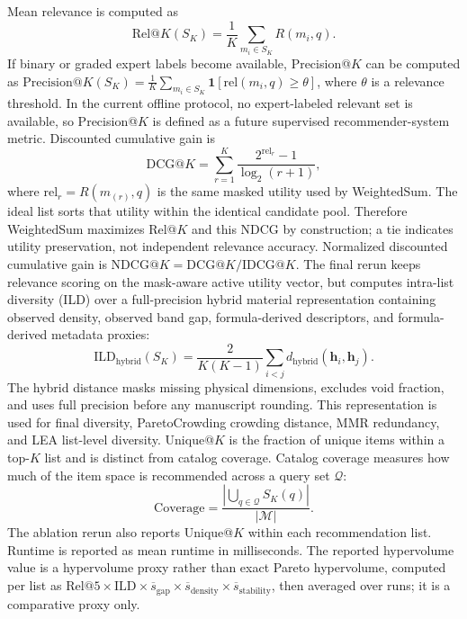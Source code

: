 \documentclass[12pt,a4paper]{article}
\begin{document}
Mean relevance is computed as
\begin{equation}
  \mathrm{Rel}@K(S_K) = \frac{1}{K}\sum_{m_i \in S_K} R(m_i, q).
\end{equation}
If binary or graded expert labels become available, Precision@$K$ can be computed as $\mathrm{Precision}@K(S_K) = \frac{1}{K}\sum_{m_i\in S_K}\mathbf{1}[\mathrm{rel}(m_i,q)\geq\theta]$, where $\theta$ is a relevance threshold. In the current offline protocol, no expert-labeled relevant set is available, so Precision@$K$ is defined as a future supervised recommender-system metric. Discounted cumulative gain is
\begin{equation}
  \mathrm{DCG}@K = \sum_{r=1}^{K}\frac{2^{\mathrm{rel}_r}-1}{\log_2(r+1)},
\end{equation}
where $\mathrm{rel}_r=R(m_{(r)},q)$ is the same masked utility used by WeightedSum. The ideal list sorts that utility within the identical candidate pool. Therefore WeightedSum maximizes Rel@$K$ and this NDCG by construction; a tie indicates utility preservation, not independent relevance accuracy. Normalized discounted cumulative gain is $\mathrm{NDCG}@K = \mathrm{DCG}@K / \mathrm{IDCG}@K$. The final rerun keeps relevance scoring on the mask-aware active utility vector, but computes intra-list diversity (ILD) over a full-precision hybrid material representation containing observed density, observed band gap, formula-derived descriptors, and formula-derived metadata proxies:
\begin{equation}
  \mathrm{ILD}_{\mathrm{hybrid}}(S_K) = \frac{2}{K(K-1)}\sum_{i<j}d_{\mathrm{hybrid}}(\mathbf{h}_i,\mathbf{h}_j).
\end{equation}
The hybrid distance masks missing physical dimensions, excludes void fraction, and uses full precision before any manuscript rounding. This representation is used for final diversity, ParetoCrowding crowding distance, MMR redundancy, and LEA list-level diversity. Unique@$K$ is the fraction of unique items within a top-$K$ list and is distinct from catalog coverage.
Catalog coverage measures how much of the item space is recommended across a query set $\mathcal{Q}$:
\begin{equation}
  \mathrm{Coverage} = \frac{\left|\bigcup_{q\in\mathcal{Q}}S_K(q)\right|}{|\mathcal{M}|}.
\end{equation}
The ablation rerun also reports Unique@$K$ within each recommendation list. Runtime is reported as mean runtime in milliseconds. The reported hypervolume value is a hypervolume proxy rather than exact Pareto hypervolume, computed per list as $\mathrm{Rel}@5\times\mathrm{ILD}\times\overline{s}_{\mathrm{gap}}\times\overline{s}_{\mathrm{density}}\times\overline{s}_{\mathrm{stability}}$, then averaged over runs; it is a comparative proxy only.
\end{document}
